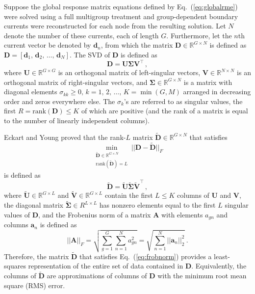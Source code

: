 \documentclass[5p,times,twocolumn,10pt]{elsarticle}
\newcommand{\EQ}[1]{Eq.~(\ref{#1})}               %
\begin{document}
    Suppose the global response matrix equations defined
    by \EQ{eq:globalrme} were solved using a full multigroup
    treatment and group-dependent boundary currents were
    reconstructed for each node from the resulting solution.
    Let $N$ denote the number of these currents, each of length
    $G$.  Furthermore, let the $n$th
    current vector be denoted by $\mathbf{d}_n$, from which
    the matrix $\mathbf{D} \in \mathbb{R}^{G\times N}$ is defined
    as $\mathbf{D} = [\mathbf{d}_1,\, \mathbf{d}_2,\, \ldots, \, \mathbf{d}_N]$.
    The SVD of $\mathbf{D}$ is defined as
    \begin{equation}
        \mathbf{D} = \mathbf{U} \bm{\Sigma} \mathbf{V}^{\intercal} \, ,
        \label{eq:svd}
    \end{equation}
    where $\mathbf{U} \in \mathbb{R}^{G\times G}$ is an orthogonal matrix of
    left-singular vectors,
    $\mathbf{V} \in \mathbb{R}^{N\times N}$ is an orthogonal matrix of
    right-singular vectors,
    and  $\bm{\Sigma} \in \mathbb{R}^{G\times N}$ is a matrix with
    diagonal elements $\sigma_{kk} \geq 0, \,  k = 1,\,2,\, \ldots,\, K =
    \min(G, M)$
    arranged in decreasing order
    and zeros everywhere else.
    The $\sigma_k$'s are referred to as singular values,
    the first $R=\text{rank}(\mathbf{D})\leq K$ of which
    are positive (and the rank of a matrix is equal to the
    number of linearly independent columns).

    Eckart and Young\cite{eckart1936approximation} proved that the rank-$L$
    matrix $\tilde{\mathbf{D}} \in \mathbb{R}^{G\times N}$
    that satisfies
    \begin{equation}
        \min_{ \substack{\tilde{\mathbf{D}} \in \mathbb{R}^{G\times N} \\
                \text{rank}(\tilde{\mathbf{D}})=L }}
        || \mathbf{D} - \tilde{\mathbf{D}} ||_F
        \label{eq:frobnorm}
    \end{equation}
    is defined as
    \begin{equation}
        \tilde{\mathbf{D}} = \tilde{\mathbf{U}} \tilde{\bm{\Sigma}}
        \tilde{\mathbf{V}}^{\intercal} \, ,
        \label{eq:svdL}
    \end{equation}
    where $\tilde{\mathbf{U}} \in \mathbb{R}^{G\times L}$
    and   $\tilde{\mathbf{V}} \in \mathbb{R}^{G\times L}$
    contain the first $L \leq K$ columns of $\mathbf{U}$ and $\mathbf{V}$,
    the diagonal matrix $\tilde{\bm{\Sigma}} \in R^{L\times L}$
    has nonzero elements equal to
    the first $L$ singular values of $\mathbf{D}$, and the
    Frobenius norm of a matrix $\mathbf{A}$ with
    elements $a_{gn}$ and columns $\mathbf{a}_n$ is defined as
    \begin{equation}
        ||\mathbf{A}||_F = \sqrt{\sum^G_{g=1} \sum^N_{n=1} a_{gn}^2} =
        \sqrt{\sum_{n=1}^N ||\mathbf{a}_n||^2_2 }\, .
    \end{equation}
    Therefore, the matrix $\tilde{\mathbf{D}}$ that satisfies \EQ{eq:frobnorm}
    provides a least-squares representation of the entire set of data contained
    in $\mathbf{D}$.  Equivalently, the columns of $\tilde{\mathbf{D}}$ are
    approximations of columns of $\mathbf{D}$ with the minimum root mean square
    (RMS) error.
\end{document}
